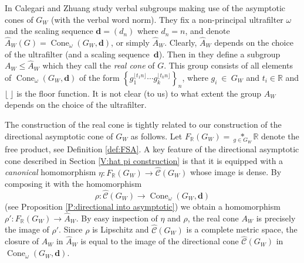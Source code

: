 \documentclass[12pt]{amsart}
\theoremstyle{definition}
\def\RR{\ensuremath{\mathbb{R}}}
\newcommand{\B}[1]{\mathbf{#1}}
\newcommand{\OP}[1]{\operatorname{#1}}
\def\Cone{\OP{Cone}}
\def\Free{F}
\def\tC{\hat{\mathcal{C}}}
\begin{document}
In \cite{MR2866929} Calegari and Zhuang study verbal subgroups making use of the asymptotic cones of $G_W$ (with the verbal word norm).
They fix a non-principal ultrafilter $\omega$ and the scaling sequence $\B d=(d_n)$ where $d_n=n$, and denote $\hat{A}_W(G) = \Cone_\omega(G_W,\B d)$, or simply $\hat{A}_W$.
Clearly, $\hat{A}_W$ depends on the choice of the ultrafilter (and a scaling sequence~$\B d$).
Then in \cite[Section 3.4, Definition 3.8]{MR2866929} they define a subgroup $A_W \leq \hat{A}_W$ which they call the {\em real cone} of $G$.
This group consists of all elements of $\Cone_\omega(G_W,\B d)$ of the form 
$\left\{ g_1^{\lfloor t_1n \rfloor} \cdots g_k^{\lfloor t_kn \rfloor} \right\}_n$, 
where $g_i~\in~G_W$ and $t_i \in \RR$ and $\lfloor \ \rfloor$ is the floor function.
It is not clear (to us) to what extent the group $A_W$ depends on the choice of the ultrafilter.

The construction of the real cone is tightly related to our construction of the directional asymptotic cone of $G_W$ as follows.
Let $\Free_\RR(G_W)=\underset{g \in G_W}{*} \RR$ denote the free product, see Definition \ref{def:FSA}.
A key feature of the directional asymptotic cone described in Section \ref{V:hat pi construction} is that it is equipped with a {\em canonical} homomorphism $\eta \colon \Free_\RR(G_W) \to \tC(G_W)$ whose image is dense.
By composing it with the homomorphism 
\[
\rho \colon \tC(G_W) \to \Cone_\omega(G_W,\B d)
\]
(see Proposition \ref{P:directional into asymptotic}) we obtain a homomorphism $\rho' \colon \Free_\RR(G_W) \to \hat{A}_W$.
By easy inspection of $\eta$ and $\rho$,  the real cone $A_W$ is precisely the image of $\rho'$.
Since $\rho$ is Lipschitz and $\tC(G_W)$ is a complete metric space, the closure of $A_W$ in $\hat{A}_W$ is equal to the image of the directional cone $\tC(G_W)$ in $\Cone_\omega(G_W,\B d)$.
\end{document}

